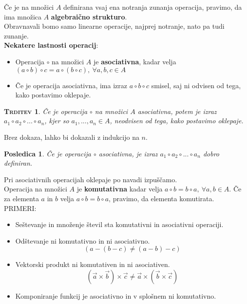 \documentclass[a4paper,12pt]{article}
\newtheorem*{trditev}{\textsc{Trditev}}
\newtheorem*{posl}{Posledica}
\begin{document}
\noindent Če je na množici $A$ definirana vsaj ena notranja zunanja operacija, pravimo, da ima množica $A$ \textbf{algebraično strukturo}. \\

\noindent Obravnavali bomo samo linearne operacije, najprej notranje, nato pa tudi zunanje. \\

\noindent \textbf{Nekatere lastnosti operacij}:
\begin{itemize}
\item Operacija $\circ$ na množici $A$ je \textbf{asociativna}, kadar velja $(a \circ b) \circ c = a \circ (b \circ c),~\forall a,b,c \in A$
\item Če je operacija asociativna, ima izraz $a \circ b \circ c$ smisel, saj ni odvisen od tega, kako postavimo oklepaje.\\
\end{itemize}

\begin{trditev}
Če je operacija $\circ$ na množici $A$ asociativna, potem je izraz 
$a_1 \circ a_2 \circ ... \circ a_n$, kjer so $a_1, ..., a_n \in A$, neodvisen od tega, kako postavimo oklepaje.\\
\end{trditev}

Brez dokaza, lahko bi dokazali z indukcijo na $n$. \\

\begin{posl}
Če je operacija $\circ$ asociativna, je izraz $a_1 \circ a_2 \circ ... \circ a_n$ dobro definiran.\\
\end{posl}

\noindent Pri asociativnih operacijah oklepaje po navadi izpuščamo.\\

\noindent Operacija na množici $A$ je \textbf{komutativna} kadar velja $a \circ b = b \circ a,~\forall a,b\in A$. Če za elementa $a$ in $b$ velja $a \circ b = b \circ a$, pravimo, da elementa komutirata. \\

\noindent PRIMERI:
\begin{itemize}
\item Seštevanje in množenje števil sta komutativni in asociativni operaciji.
\item Odštevanje ni komutativno in ni asociativno. $$(a-(b-c)\neq(a-b)-c)$$
\item Vektorski produkt ni komutativen in  ni asociativen. $$(\vec{a} \times \vec{b})\times \vec{c} \neq \vec{a} \times (\vec{b}\times \vec{c})$$
\item Komponiranje funkcij je asociativno in v splošnem ni komutativno.\\
\end{itemize}
\end{document}
